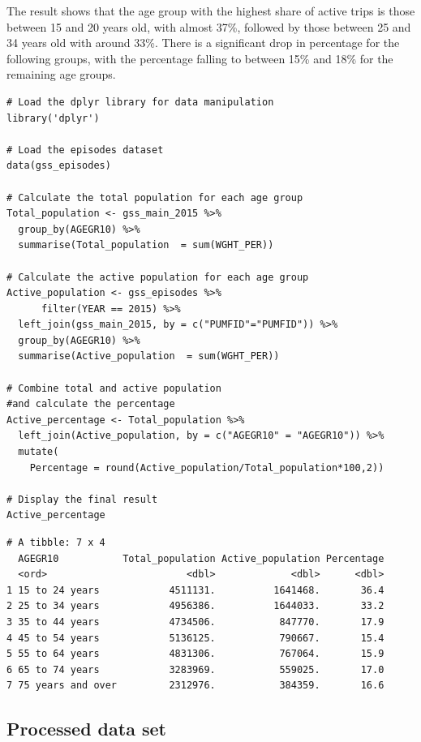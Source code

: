 \documentclass[Royal,times,sageh]{sagej}
\begin{document}
The result shows that the age group with the highest share of active
trips is those between 15 and 20 years old, with almost 37\%, followed
by those between 25 and 34 years old with around 33\%. There is a
significant drop in percentage for the following groups, with the
percentage falling to between 15\% and 18\% for the remaining age
groups.

\begin{verbatim}
# Load the dplyr library for data manipulation
library('dplyr')

# Load the episodes dataset
data(gss_episodes) 

# Calculate the total population for each age group
Total_population <- gss_main_2015 %>% 
  group_by(AGEGR10) %>% 
  summarise(Total_population  = sum(WGHT_PER))

# Calculate the active population for each age group
Active_population <- gss_episodes %>% 
      filter(YEAR == 2015) %>% 
  left_join(gss_main_2015, by = c("PUMFID"="PUMFID")) %>% 
  group_by(AGEGR10) %>% 
  summarise(Active_population  = sum(WGHT_PER))

# Combine total and active population 
#and calculate the percentage
Active_percentage <- Total_population %>% 
  left_join(Active_population, by = c("AGEGR10" = "AGEGR10")) %>%
  mutate(
    Percentage = round(Active_population/Total_population*100,2))

# Display the final result
Active_percentage
\end{verbatim}

\begin{verbatim}
# A tibble: 7 x 4
  AGEGR10           Total_population Active_population Percentage
  <ord>                        <dbl>             <dbl>      <dbl>
1 15 to 24 years            4511131.          1641468.       36.4
2 25 to 34 years            4956386.          1644033.       33.2
3 35 to 44 years            4734506.           847770.       17.9
4 45 to 54 years            5136125.           790667.       15.4
5 55 to 64 years            4831306.           767064.       15.9
6 65 to 74 years            3283969.           559025.       17.0
7 75 years and over         2312976.           384359.       16.6
\end{verbatim}

\hypertarget{processed-data-set}{%
\subsection{Processed data set}\label{processed-data-set}}
\end{document}
